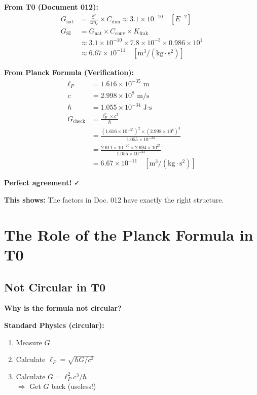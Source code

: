 	\begin{verification}
		\textbf{From T0 (Document 012):}
		\begin{align}
			G_{\text{nat}} &= \frac{\xi^2}{4m_e} \times C_{\text{dim}} \approx 3.1 \times 10^{-10} \quad [E^{-2}] \\
			G_{\text{SI}} &= G_{\text{nat}} \times C_{\text{conv}} \times K_{\text{frak}} \\
			&\approx 3.1 \times 10^{-10} \times 7.8 \times 10^{-3} \times 0.986 \times 10^{1} \\
			&\approx 6.67 \times 10^{-11} \quad [\text{m}^3/(\text{kg} \cdot \text{s}^2)]
		\end{align}
		
		\textbf{From Planck Formula (Verification):}
		\begin{align}
			\ell_P &= 1.616 \times 10^{-35} \text{ m} \\
			c &= 2.998 \times 10^8 \text{ m/s} \\
			\hbar &= 1.055 \times 10^{-34} \text{ J·s} \\
			G_{\text{check}} &= \frac{\ell_P^2 \times c^3}{\hbar} \\
			&= \frac{(1.616 \times 10^{-35})^2 \times (2.998 \times 10^8)^3}{1.055 \times 10^{-34}} \\
			&= \frac{2.611 \times 10^{-70} \times 2.694 \times 10^{25}}{1.055 \times 10^{-34}} \\
			&= 6.67 \times 10^{-11} \quad [\text{m}^3/(\text{kg} \cdot \text{s}^2)]
		\end{align}
		
		\textbf{Perfect agreement!} ✓
		
		\textbf{This shows:} The factors in Doc. 012 have exactly the right structure.
	\end{verification}
	
	\section{The Role of the Planck Formula in T0}
	
	\subsection{Not Circular in T0}
	
	\textbf{Why is the formula not circular?}
	
	\textbf{Standard Physics (circular):}
	\begin{enumerate}
		\item Measure $G$
		\item Calculate $\ell_P = \sqrt{\hbar G / c^3}$
		\item Calculate $G = \ell_P^2 c^3 / \hbar$ \\
		$\Rightarrow$ Get $G$ back (useless!)
	\end{enumerate}
	
